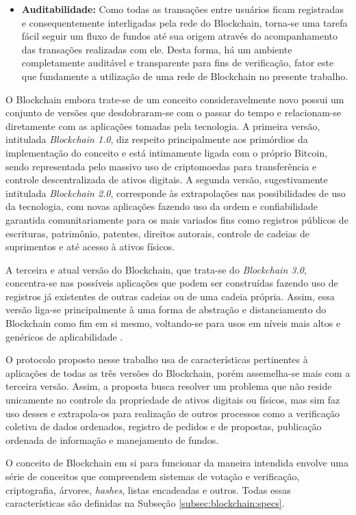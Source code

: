 \begin{itemize}
    \item \textbf{Auditabilidade:} Como todas as transações entre usuários ficam registradas e consequentemente interligadas pela rede do Blockchain, torna-se uma tarefa fácil seguir um fluxo de fundos até sua origem através do acompanhamento das transações realizadas com ele. Desta forma, há um ambiente completamente auditável e transparente para fins de verificação, fator este que fundamente a utilização de uma rede de Blockchain no presente trabalho.
\end{itemize}

%
O Blockchain embora trate-se de um conceito consideravelmente novo possui um conjunto de versões que desdobraram-se com o passar do tempo e relacionam-se diretamente com as aplicações tomadas pela tecnologia. A primeira versão, intitulada \textit{Blockchain 1.0}, diz respeito principalmente aos primórdios da implementação do conceito e está intimamente ligada com o próprio Bitcoin, sendo representada pelo massivo uso de criptomoedas para transferência e controle descentralizada de ativos digitais. A segunda versão, sugestivamente intitulada \textit{Blockchain 2.0}, corresponde às extrapolações nas possibilidades de uso da tecnologia, com novas aplicações fazendo uso da ordem e confiabilidade garantida comunitariamente para os mais variados fins como registros públicos de escrituras, patrimônio, patentes, direitos autorais, controle de cadeias de suprimentos e até acesso à ativos físicos.

%
A terceira e atual versão do Blockchain, que trata-se do \textit{Blockchain 3.0}, concentra-se nas possíveis aplicações que podem ser construídas fazendo uso de registros já existentes de outras cadeias ou de uma cadeia própria. Assim, essa versão liga-se principalmente à uma forma de abstração e distanciamento do Blockchain como fim em si mesmo, voltando-se para usos em níveis mais altos e genéricos de aplicabilidade \cite{blockchain:versoes}.

%
O protocolo proposto nesse trabalho usa de características pertinentes à aplicações de todas as três versões do Blockchain, porém assemelha-se mais com a terceira versão. Assim, a proposta busca resolver um problema que não reside unicamente no controle da propriedade de ativos digitais ou físicos, mas sim faz uso desses e extrapola-os para realização de outros processos como a verificação coletiva de dados ordenados, registro de pedidos e de propostas, publicação ordenada de informação e manejamento de fundos.

%
O conceito de Blockchain em si para funcionar da maneira intendida envolve uma série de conceitos que compreendem sistemas de votação e verificação, criptografia, árvores, \textit{hashes}, listas encadeadas e outros. Todas essas características são definidas na Subseção \ref{subsec:blockchain:specs}.

